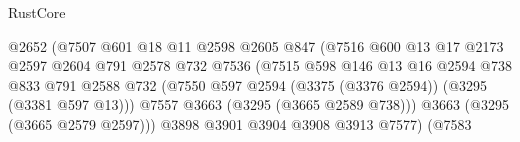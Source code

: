 \begin{lexlean}{RustCore}
\begin{coremodule}
                                            @2652
                                            (@7507
                                              @601
                                              @18
                                              @11
                                              @2598
                                              @2605
                                              @847
                                              (@7516
                                                @600
                                                @13
                                                @17
                                                @2173
                                                @2597
                                                @2604
                                                @791
                                                @2578
                                                @732
                                                @7536
                                                (@7515
                                                  @598
                                                  @146
                                                  @13
                                                  @16
                                                  @2594
                                                  @738
                                                  @833
                                                  @791
                                                  @2588
                                                  @732
                                                  (@7550
                                                    @597
                                                    @2594
                                                    (@3375 (@3376 @2594))
                                                    (@3295 (@3381 @597 @13)))
                                                  @7557
                                                  @3663
                                                  (@3295 (@3665 @2589 @738)))
                                                @3663
                                                (@3295 (@3665 @2579 @2597)))
                                              @3898
                                              @3901
                                              @3904
                                              @3908
                                              @3913
                                              @7577)
                                            (@7583

\end{coremodule}
\end{lexlean}
